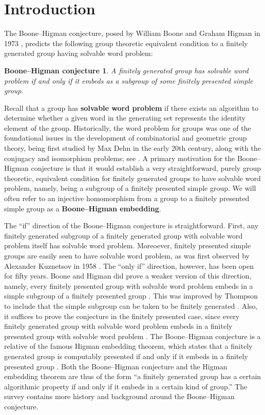 \documentclass[11pt,letterpaper]{amsart}
\newtheorem*{bhconj}{Boone--Higman conjecture}
\theoremstyle{definition}
\newcommand{\newword}[1]{\textbf{#1}}
\begin{document}
\section{Introduction}\label{sec:intro}

The Boone--Higman conjecture, posed by William Boone and Graham Higman in 1973 \cite{boone73,boonehigman}, predicts the following group theoretic equivalent condition to a finitely generated group having solvable word problem:

\begin{bhconj}
A finitely generated group has solvable word problem if and only if it embeds as a subgroup of some finitely presented simple group.
\end{bhconj}

Recall that a group has \newword{solvable word problem} if there exists an algorithm to determine whether a given word in the generating set represents the identity element of the group. Historically, the word problem for groups was one of the foundational issues in the development of combinatorial and geometric group theory, being first studied by Max Dehn in the early 20th century, along with the conjugacy and isomorphism problems; see \cite{dehn12}. A primary motivation for the Boone--Higman conjecture is that it would establish a very straightforward, purely group theoretic, equivalent condition for finitely generated groups to have solvable word problem, namely, being a subgroup of a finitely presented simple group. We will often refer to an injective homomorphism from a group to a finitely presented simple group as a \newword{Boone--Higman embedding}.

The ``if'' direction of the Boone--Higman conjecture is straightforward. First, any finitely generated subgroup of a finitely generated group with solvable word problem itself has solvable word problem. Moreoever, finitely presented simple groups are easily seen to have solvable word problem, as was first observed by Alexander Kuznetsov in 1958 \cite{kuznetsov}. The ``only if'' direction, however, has been open for fifty years. Boone and Higman did prove a weaker version of this direction, namely, every finitely presented group with solvable word problem embeds in a simple subgroup of a finitely presented group \cite{boonehigman}. This was improved by Thompson to include that the simple subgroup can be taken to be finitely generated \cite{thompson80}. Also, it suffices to prove the conjecture in the finitely presented case, since every finitely generated group with solvable word problem embeds in a finitely presented group with solvable word problem \cite{clapham}. The Boone--Higman conjecture is a relative of the famous Higman embedding theorem, which states that a finitely generated group is computably presented if and only if it embeds in a finitely presented group \cite{higman61}. Both the Boone--Higman conjecture and the Higman embedding theorem are thus of the form ``a finitely generated group has a certain algorithmic property if and only if it embeds in a certain kind of group.'' The survey \cite{bbmz_survey} contains more history and background around the Boone--Higman conjecture.
\end{document}
